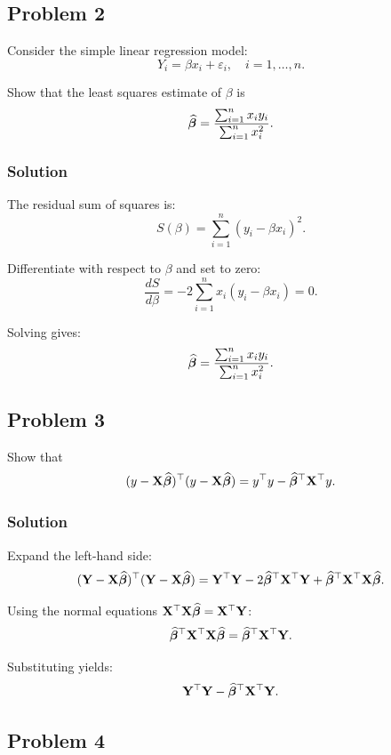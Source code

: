\subsection{Problem 2}

Consider the simple linear regression model:
\[
Y_i = \beta x_i + \varepsilon_i, \quad i = 1,\dots,n.
\]

Show that the least squares estimate of $\beta$ is
\[
\widehat{\boldsymbol{\beta}} = \frac{\sum_{i=1}^n x_i y_i}{\sum_{i=1}^n x_i^2}.
\]

\subsubsection*{Solution}

The residual sum of squares is:
\[
S(\beta) = \sum_{i=1}^n (y_i - \beta x_i)^2.
\]

Differentiate with respect to $\beta$ and set to zero:
\[
\frac{dS}{d\beta} = -2\sum_{i=1}^n x_i(y_i - \beta x_i) = 0.
\]

Solving gives:
\[
\widehat{\boldsymbol{\beta}} = \frac{\sum_{i=1}^n x_i y_i}{\sum_{i=1}^n x_i^2}.
\]

\subsection{Problem 3}

Show that
\[
(y - \mathbf{X}\widehat{\boldsymbol{\beta}})^\top (y - \mathbf{X}\widehat{\boldsymbol{\beta}}) = y^\top y - \widehat{\boldsymbol{\beta}}^\top \mathbf{X}^\top y.
\]

\subsubsection*{Solution}

Expand the left-hand side:
\[
(\mathbf{Y} - \mathbf{X}\widehat{\boldsymbol{\beta}})^\top (\mathbf{Y} - \mathbf{X}\widehat{\boldsymbol{\beta}})
= \mathbf{Y}^\top \mathbf{Y} - 2\widehat{\boldsymbol{\beta}}^\top \mathbf{X}^\top \mathbf{Y} + \widehat{\boldsymbol{\beta}}^\top \mathbf{X}^\top \mathbf{X} \widehat{\boldsymbol{\beta}}.
\]

Using the normal equations $\mathbf{X}^\top \mathbf{X} \widehat{\boldsymbol{\beta}} = \mathbf{X}^\top \mathbf{Y}$:
\[
\widehat{\boldsymbol{\beta}}^\top \mathbf{X}^\top \mathbf{X} \widehat{\boldsymbol{\beta}} = \widehat{\boldsymbol{\beta}}^\top \mathbf{X}^\top \mathbf{Y}.
\]

Substituting yields:
\[
\mathbf{Y}^\top \mathbf{Y} - \widehat{\boldsymbol{\beta}}^\top \mathbf{X}^\top \mathbf{Y}.
\]

\subsection{Problem 4}

